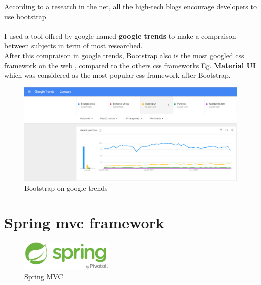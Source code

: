 \documentclass[12pt]{article}
\begin{document}
\vspace{66mm}
According to a research in the net, all the high-tech blogs encourage developers to use bootstrap.
\\
\\
 I used a tool offred by google named \textbf{google trends} to make a compraison between subjects in term of most researched.
 \\
 After this compraison in google trends, Bootstrap also is the most googled css framework on the web , compared to the others css frameworks Eg. \textbf{Material UI} which was considered as the most popular css framework after Bootstrap.

\begin{figure}[h]
	\centering
	\includegraphics[width=1\textwidth]{Boostrap_statics_google_trends.png}
	\caption{Bootstrap on google trends}
\end{figure}

\clearpage
\newpage


\section{Spring mvc framework}
\begin{figure}[h]
	\centering
	\includegraphics[width=0.4\textwidth]{Spring_logo.png}
	\caption{Spring MVC}
\end{figure}
\end{document}
